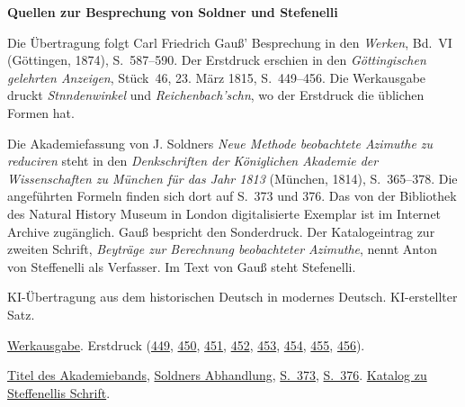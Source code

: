 \clearpage\thispagestyle{empty}
\begin{center}\Large\bfseries Quellen zur Besprechung von Soldner und Stefenelli\end{center}

Die Übertragung folgt Carl Friedrich Gauß' Besprechung in den \emph{Werken}, Bd.~VI (Göttingen, 1874), S.~587--590. Der Erstdruck erschien in den \emph{Göttingischen gelehrten Anzeigen}, Stück~46, 23. März 1815, S.~449--456. Die Werkausgabe druckt \emph{Stnndenwinkel} und \emph{Reichenbach'schn}, wo der Erstdruck die üblichen Formen hat.

Die Akademiefassung von J. Soldners \emph{Neue Methode beobachtete Azimuthe zu reduciren} steht in den \emph{Denkschriften der Königlichen Akademie der Wissenschaften zu München für das Jahr 1813} (München, 1814), S.~365--378. Die angeführten Formeln finden sich dort auf S.~373 und 376. Das von der Bibliothek des Natural History Museum in London digitalisierte Exemplar ist im Internet Archive zugänglich. Gauß bespricht den Sonderdruck. Der Katalogeintrag zur zweiten Schrift, \emph{Beyträge zur Berechnung beobachteter Azimuthe}, nennt Anton von Steffenelli als Verfasser. Im Text von Gauß steht Stefenelli.

KI-Übertragung aus dem historischen Deutsch in modernes Deutsch. KI-erstellter Satz.

\href{https://gdz.sub.uni-goettingen.de/id/PPN236007467}{Werkausgabe}. Erstdruck (\href{https://images.p.sub.uni-goettingen.de/iiif/image/gdz:PPN319721507_1815:00000453/full/1650,/0/default.jpg}{449}, \href{https://images.p.sub.uni-goettingen.de/iiif/image/gdz:PPN319721507_1815:00000454/full/1650,/0/default.jpg}{450}, \href{https://images.p.sub.uni-goettingen.de/iiif/image/gdz:PPN319721507_1815:00000455/full/1650,/0/default.jpg}{451}, \href{https://images.p.sub.uni-goettingen.de/iiif/image/gdz:PPN319721507_1815:00000456/full/1650,/0/default.jpg}{452}, \href{https://images.p.sub.uni-goettingen.de/iiif/image/gdz:PPN319721507_1815:00000457/full/1650,/0/default.jpg}{453}, \href{https://images.p.sub.uni-goettingen.de/iiif/image/gdz:PPN319721507_1815:00000458/full/1650,/0/default.jpg}{454}, \href{https://images.p.sub.uni-goettingen.de/iiif/image/gdz:PPN319721507_1815:00000459/full/1650,/0/default.jpg}{455}, \href{https://images.p.sub.uni-goettingen.de/iiif/image/gdz:PPN319721507_1815:00000460/full/1650,/0/default.jpg}{456}).

\href{https://archive.org/details/denkschriftender04munc/page/n8/mode/1up}{Titel des Akademiebands},
\href{https://archive.org/download/denkschriftender04munc/page/365.jpg}{Soldners Abhandlung},
\href{https://archive.org/download/denkschriftender04munc/page/373.jpg}{S.~373},
\href{https://archive.org/download/denkschriftender04munc/page/376.jpg}{S.~376}.
\href{https://books.google.com/books?id=z2Y_AAAAcAAJ}{Katalog zu Steffenellis Schrift}.

\clearpage
